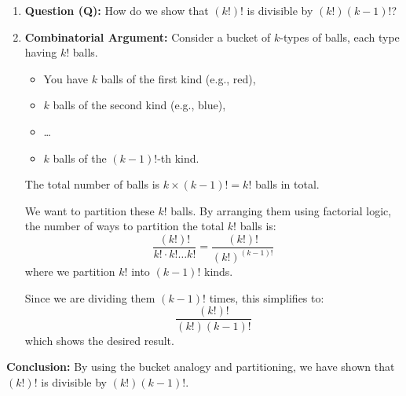 \begin{example}
    \begin{enumerate}
        \item \textbf{Question (Q):} 
        How do we show that \( (k!)! \) is divisible by \( (k!)(k-1)! \)?
    
        \item \textbf{Combinatorial Argument:} 
        Consider a bucket of \( k \)-types of balls, each type having \( k! \) balls.
        
        \begin{itemize}
            \item You have \( k \) balls of the first kind (e.g., red),
            \item \( k \) balls of the second kind (e.g., blue),
            \item \dots
            \item \( k \) balls of the \( (k-1)! \)-th kind.
        \end{itemize}
        
        The total number of balls is \( k \times (k-1)! = k! \) balls in total.
    
        We want to partition these \( k! \) balls. By arranging them using factorial logic, the number of ways to partition the total \( k! \) balls is:
        \[
        \frac{(k!)!}{k! \cdot k! \dots k!} = \frac{(k!)!}{(k!)^{(k-1)!}} 
        \]
        where we partition \( k! \) into \( (k-1)! \) kinds.
    
        Since we are dividing them \( (k-1)! \) times, this simplifies to:
        \[
        \frac{(k!)!}{(k!)(k-1)!}
        \]
        which shows the desired result.
    
    \end{enumerate}
    
    \textbf{Conclusion:} 
    By using the bucket analogy and partitioning, we have shown that \( (k!)! \) is divisible by \( (k!)(k-1)! \).
\end{example}


